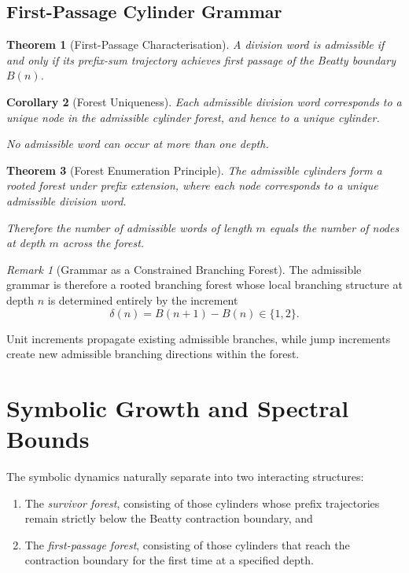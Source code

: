 \documentclass[12pt, oneside]{article}
\numberwithin{equation}{section}
\theoremstyle{definition}
\theoremstyle{plain}
\newtheorem{theorem}{Theorem}[section]
\newtheorem{corollary}[theorem]{Corollary}
\theoremstyle{remark}
\newtheorem*{remark}{Remark}
\begin{document}
\subsection{First-Passage Cylinder Grammar}

\begin{theorem}[First-Passage Characterisation]
A division word is admissible if and only if its prefix-sum trajectory
achieves first passage of the Beatty boundary \(B(n)\).
\end{theorem}

\begin{corollary}[Forest Uniqueness]
Each admissible division word corresponds to a unique node in the
admissible cylinder forest, and hence to a unique cylinder.

No admissible word can occur at more than one depth.
\end{corollary}

\begin{theorem}[Forest Enumeration Principle]
The admissible cylinders form a rooted forest under prefix extension,
where each node corresponds to a unique admissible division word.

Therefore the number of admissible words of length \(m\) equals the
number of nodes at depth \(m\) across the forest.
\end{theorem}

\begin{remark}[Grammar as a Constrained Branching Forest]
The admissible grammar is therefore a rooted branching forest whose
local branching structure at depth \(n\) is determined entirely by the
increment
\[
\delta(n)=B(n+1)-B(n)\in\{1,2\}.
\]

Unit increments propagate existing admissible branches, while jump
increments create new admissible branching directions within the forest.
\end{remark}

\section{Symbolic Growth and Spectral Bounds}
\label{sec:symbolic-growth}

The symbolic dynamics naturally separate into two interacting
structures:

\begin{enumerate}
\item The \emph{survivor forest}, consisting of those cylinders whose
prefix trajectories remain strictly below the Beatty contraction
boundary, and

\item The \emph{first-passage forest}, consisting of those cylinders that
reach the contraction boundary for the first time at a specified depth.
\end{enumerate}
\end{document}
